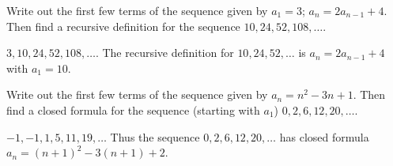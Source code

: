 \begin{questions}

	\begin{answer}
	\end{answer}
	
	
	


\question Write out the first few terms of the sequence given by $a_1 = 3$; $a_n = 2a_{n-1} + 4$.  Then find a recursive definition for the sequence $10, 24, 52, 108, \ldots$.

	\begin{answer}
		$3, 10, 24, 52, 108,\ldots$.  The recursive definition for $10, 24, 52, \ldots$ is $a_n = 2a_{n-1} + 4$ with $a_1 = 10$.
	\end{answer}
	
	
	


\question Write out the first few terms of the sequence given by $a_n = n^2 - 3n + 1$.  Then find a closed formula for the sequence (starting with $a_1$) $0, 2, 6, 12, 20, \ldots$.

	\begin{answer}
		$-1, -1, 1, 5, 11, 19,\ldots$  Thus the sequence $0, 2, 6, 12, 20,\ldots$ has closed formula $a_n = (n+1)^2 - 3(n+1) + 2$.
	\end{answer}
	
\end{questions}